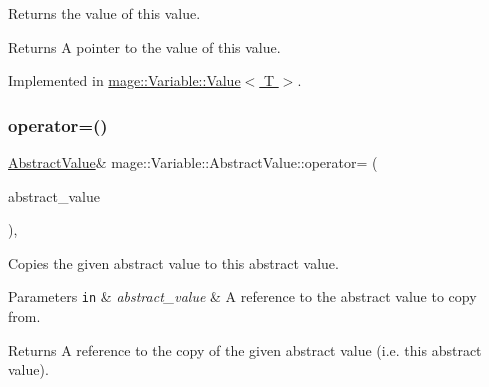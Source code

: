 Returns the value of this value.

\begin{DoxyReturn}{Returns}
A pointer to the value of this value. 
\end{DoxyReturn}


Implemented in \hyperlink{structmage_1_1_variable_1_1_value_a04d70496ebb7ad71dafa3df877daeb26}{mage\+::\+Variable\+::\+Value$<$ T $>$}.

\hypertarget{structmage_1_1_variable_1_1_abstract_value_a77f7107e78716a0ea76cfaedd0a50a4b}{}\label{structmage_1_1_variable_1_1_abstract_value_a77f7107e78716a0ea76cfaedd0a50a4b} 
\subsubsection{\texorpdfstring{operator=()}{operator=()}}
{\footnotesize\ttfamily \hyperlink{structmage_1_1_variable_1_1_abstract_value}{Abstract\+Value}\& mage\+::\+Variable\+::\+Abstract\+Value\+::operator= (\begin{DoxyParamCaption}\item[{const \hyperlink{structmage_1_1_variable_1_1_abstract_value}{Abstract\+Value} \&}]{abstract\+\_\+value }\end{DoxyParamCaption})\hspace{0.3cm}{\ttfamily [private]}, {\ttfamily [delete]}}

Copies the given abstract value to this abstract value.


\begin{DoxyParams}[1]{Parameters}
\mbox{\tt in}  & {\em abstract\+\_\+value} & A reference to the abstract value to copy from. \\
\hline
\end{DoxyParams}
\begin{DoxyReturn}{Returns}
A reference to the copy of the given abstract value (i.\+e. this abstract value). 
\end{DoxyReturn}
